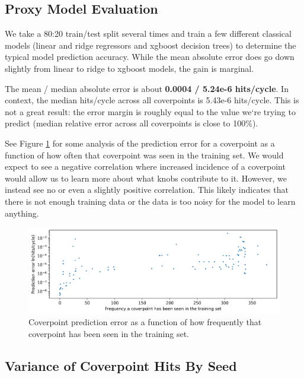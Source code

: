 \documentclass[sigconf,noacm]{acmart}
\begin{document}
\subsection{Proxy Model Evaluation}

We take a 80:20 train/test split several times and train a few different classical models (linear and ridge regressors and xgboost decision trees) to determine the typical model prediction accuracy.
While the mean absolute error does go down slightly from linear to ridge to xgboost models, the gain is marginal.

The mean / median absolute error is about \textbf{0.0004 / 5.24e-6 hits/cycle}.
In context, the median hits/cycle across all coverpoints is 5.43e-6 hits/cycle.
This is not a great result: the error margin is roughly equal to the value we`re trying to predict (median relative error across all coverpoints is close to 100\%).

See Figure \ref{fig:error_vs_seen_freq} for some analysis of the prediction error for a coverpoint as a function of how often that coverpoint was seen in the training set.
We would expect to see a negative correlation where increased incidence of a coverpoint would allow us to learn more about what knobs contribute to it.
However, we instead see no or even a slightly positive correlation.
This likely indicates that there is not enough training data or the data is too noisy for the model to learn anything.

\begin{figure}
  \includegraphics[width=\linewidth]{figs/error_vs_seen_freq.png}
  \caption{Coverpoint prediction error as a function of how frequently that coverpoint has been seen in the training set.}
  \label{fig:error_vs_seen_freq}
\end{figure}

\subsection{Variance of Coverpoint Hits By Seed}
\end{document}
